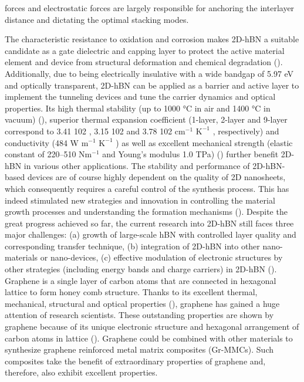 forces and electrostatic forces are largely responsible for anchoring the interlayer distance and dictating the optimal stacking modes.

The characteristic resistance to oxidation and corrosion makes 2D-hBN a suitable candidate as a gate dielectric and capping layer to protect the active material element and device from structural deformation and chemical degradation (\cite{li2016atomically}). Additionally, due to being electrically insulative with a wide bandgap of 5.97 eV and optically transparent, 2D-hBN can be applied as a barrier and active layer to implement the tunneling devices and tune the carrier dynamics and optical properties. Its high thermal stability (up to 1000 °C in air and 1400 °C in vacuum) (\cite{li2014strong}), superior thermal expansion coefficient (1-layer, 2-layer and 9-layer correspond to 3.41 102 , 3.15 102 and 3.78 102 c$\text{m}^{-1}$ $\text{K}^{-1}$ , respectively) and conductivity (484 W $\text{m}^{-1}$ $\text{K}^{-1}$ ) as well as excellent mechanical strength (elastic constant of 220–510 N$\text{m}^{-1}$ and Young’s modulus 1.0 TPa) (\cite{kumar2016optimised, wang2016fabrication}) further benefit 2D-hBN in various other applications. The stability and performance of 2D-hBN-based devices are of course highly dependent on the quality of 2D nanosheets, which consequently requires a careful control of the synthesis process. This has indeed stimulated new strategies and innovation in controlling the material growth processes and understanding the formation mechanisms (\cite{wang2016fabrication, bao2016synthesis}). Despite the great progress achieved so far, the current research into 2D-hBN still faces three major challenges: (a) growth of large-scale hBN with controlled layer quality and corresponding transfer technique, (b) integration of 2D-hBN into other nano-materials or nano-devices, (c) effective modulation of electronic structures by other strategies (including energy bands and charge carriers) in 2D-hBN (\cite{nam2014graphene}).
Graphene is a single layer of carbon atoms that are connected in hexagonal lattice to form honey comb structure. Thanks to its excellent thermal, mechanical, structural and optical properties (\cite{lee2008measurement, calizo2009raman, ahn2014things, balandin2008superior}), graphene has gained a huge attention of research scientists. These outstanding properties are shown by graphene because of its unique electronic structure and hexagonal arrangement of carbon atoms in lattice (\cite{neto2006drawing}). Graphene could be combined with other materials to synthesize graphene reinforced metal matrix composites (Gr-MMCs). Such composites take the benefit of extraordinary properties of graphene and, therefore, also exhibit excellent properties.

